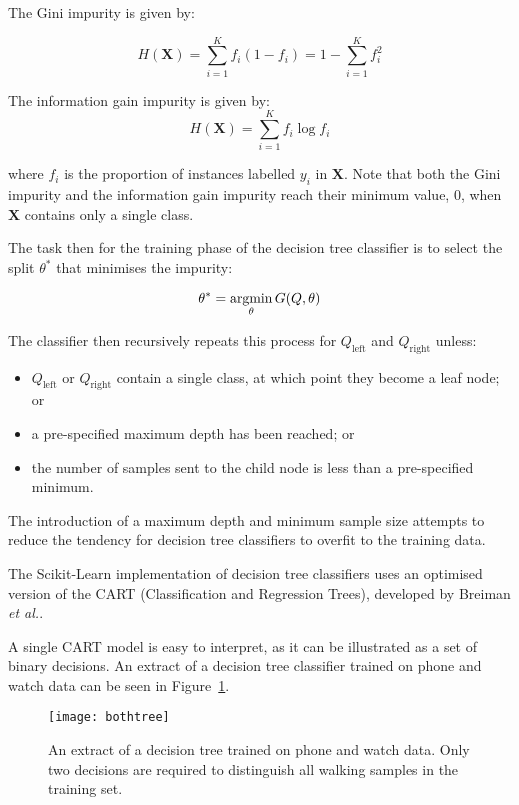         The Gini impurity is given by:
      
        $$H(\mathbf{X}) = \sum \limits_{i=1}^K f_i(1-f_i) = 1 - \sum \limits_{i=1}^K f_i^2$$
      
        The information gain impurity is given by:
        $$H(\mathbf{X}) = \sum \limits_{i=1}^K f_i \log f_i$$
      
        where $f_i$ is the proportion of instances labelled $y_i$ in $\mathbf{X}$. Note that both the Gini impurity and the information gain impurity reach their minimum value, $0$, when $\mathbf{X}$ contains only a single class.
      
        The task then for the training phase of the decision tree classifier is to select the split $\theta^*$ that minimises the impurity:
      
        $$\theta^* = \operatorname*{argmin}_\theta G(Q, \theta)$$
      
        The classifier then recursively repeats this process for $Q_\mathrm{left}$ and $Q_\mathrm{right}$ unless:
        \begin{itemize}
          \item $Q_\mathrm{left}$ or $Q_\mathrm{right}$ contain a single class, at which point they become a leaf node; or
          \item a pre-specified maximum depth has been reached; or
          \item the number of samples sent to the child node is less than a pre-specified minimum.
        \end{itemize}
      
        The introduction of a maximum depth and minimum sample size attempts to reduce the tendency for decision tree classifiers to overfit to the training data.
      
        The Scikit-Learn implementation of decision tree classifiers uses an optimised version of the CART (Classification and Regression Trees), developed by Breiman \emph{et al.}\cite{breiman1984classification}.
        
        A single CART model is easy to interpret, as it can be illustrated as a set of binary decisions. An extract of a decision tree classifier trained on phone and watch data can be seen in Figure~\ref{fig:decision-tree}.
        
        \begin{figure}
          \centering
          \texttt{[image: bothtree]}
          \caption[An extract of a decision tree classifier]{An extract of a decision tree trained on phone and watch data. Only two decisions are required to distinguish all walking samples in the training set.}
          \label{fig:decision-tree}
        \end{figure}
        
